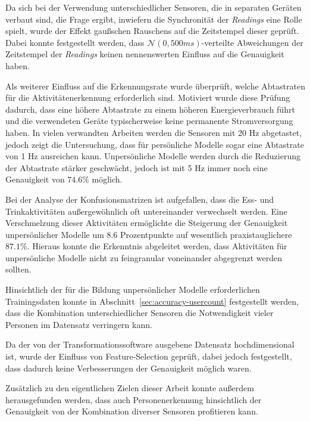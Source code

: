 Da sich bei der Verwendung unterschiedlicher Sensoren, die in separaten Geräten verbaut sind, die Frage ergibt, inwiefern die Synchronität der \textit{Readings} eine Rolle spielt, wurde der Effekt gaußschen Rauschens auf die Zeitstempel dieser geprüft. Dabei konnte festgestellt werden, dass $\mathcal{N}(0, 500ms)$-verteilte Abweichungen der Zeitstempel der \textit{Readings} keinen nennenswerten Einfluss auf die Genauigkeit haben.

Als weiterer Einfluss auf die Erkennungsrate wurde überprüft, welche Abtastraten für die Aktivitätenerkennung erforderlich sind. Motiviert wurde diese Prüfung dadurch, dass eine höhere Abtastrate zu einem höheren Energieverbrauch führt und die verwendeten Geräte typischerweise keine permanente Stromversorgung haben. In vielen verwandten Arbeiten werden die Sensoren mit 20 Hz abgetastet, jedoch zeigt die Untersuchung, dass für persönliche Modelle sogar eine Abtastrate von 1 Hz ausreichen kann. Unpersönliche Modelle werden durch die Reduzierung der Abtastrate stärker geschwächt, jedoch ist mit 5 Hz immer noch eine Genauigkeit von $74.6 \%$ möglich.

Bei der Analyse der Konfusionsmatrizen ist aufgefallen, dass die Ess- und Trinkaktivitäten außergewöhnlich oft untereinander verwechselt werden. Eine Verschmelzung dieser Aktivitäten ermöglichte die Steigerung der Genauigkeit unpersönlicher Modelle um $8.6$ Prozentpunkte auf wesentlich praxistauglichere $87.1 \%$. Hieraus konnte die Erkenntnis abgeleitet werden, dass Aktivitäten für unpersönliche Modelle nicht zu feingranular voneinander abgegrenzt werden sollten.

Hinsichtlich der für die Bildung unpersönlicher Modelle erforderlichen Trainingsdaten konnte in Abschnitt~\ref{sec:accuracy-usercount} festgestellt werden, dass die Kombination unterschiedlicher Sensoren die Notwendigkeit vieler Personen im Datensatz verringern kann. 

Da der von der Transformationssoftware ausgebene Datensatz hochdimensional ist, wurde der Einfluss von Feature-Selection geprüft, dabei jedoch festgestellt, dass dadurch keine Verbesserungen der Genauigkeit möglich waren.

Zusätzlich zu den eigentlichen Zielen dieser Arbeit konnte außerdem herausgefunden werden, dass auch Personenerkennung hinsichtlich der Genauigkeit von der Kombination diverser Sensoren profitieren kann.

